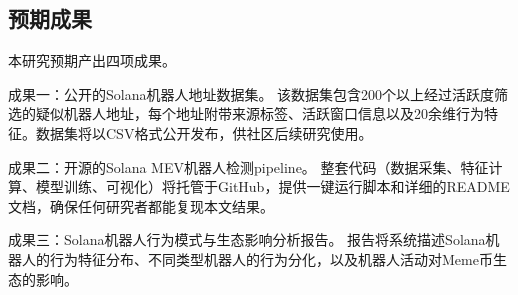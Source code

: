 \subsection{预期成果}

\par 本研究预期产出四项成果。

\par 成果一：公开的Solana机器人地址数据集。 该数据集包含200个以上经过活跃度筛选的疑似机器人地址，每个地址附带来源标签、活跃窗口信息以及20余维行为特征。数据集将以CSV格式公开发布，供社区后续研究使用。
\par 成果二：开源的Solana MEV机器人检测pipeline。 整套代码（数据采集、特征计算、模型训练、可视化）将托管于GitHub，提供一键运行脚本和详细的README文档，确保任何研究者都能复现本文结果。
\par 成果三：Solana机器人行为模式与生态影响分析报告。 报告将系统描述Solana机器人的行为特征分布、不同类型机器人的行为分化，以及机器人活动对Meme币生态的影响。